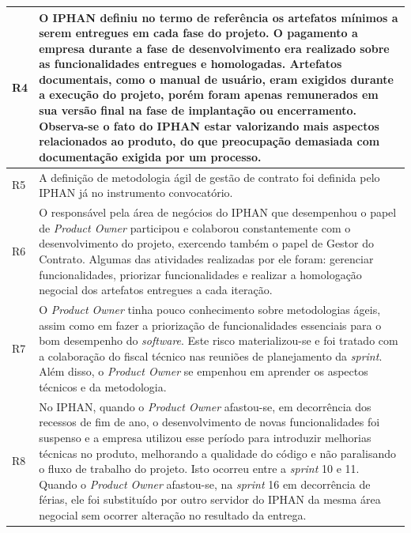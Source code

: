 \begin{longtable}{|p{2cm}|p{13cm}|}
R4                                                                &  O IPHAN definiu no termo de referência os artefatos mínimos a serem entregues em cada fase do projeto. O pagamento a empresa durante a fase de desenvolvimento era realizado sobre as funcionalidades entregues e homologadas. Artefatos documentais, como o manual de usuário, eram exigidos durante a execução do projeto, porém foram apenas remunerados em sua versão final na fase de implantação ou encerramento. Observa-se o fato do IPHAN estar valorizando mais aspectos relacionados ao produto, do que preocupação demasiada com documentação exigida por um processo.             \\ \hline
R5                                                                & A definição de metodologia ágil de gestão de contrato foi definida pelo IPHAN já no instrumento convocatório.            \\ \hline
R6                                                                & O responsável pela área de negócios do IPHAN que desempenhou o papel de \textit{Product Owner} participou e colaborou constantemente com o desenvolvimento do projeto, exercendo também o papel de Gestor do Contrato. Algumas das atividades realizadas por ele foram: gerenciar funcionalidades, priorizar funcionalidades e realizar a homologação negocial dos artefatos entregues a cada iteração. \\ \hline
R7                                                                & O \textit{Product Owner} tinha pouco conhecimento sobre metodologias ágeis, assim como em fazer a priorização de funcionalidades essenciais para o bom desempenho do \textit{software}. Este risco materializou-se e foi tratado com a colaboração do fiscal técnico nas reuniões de planejamento da \textit{sprint}. Além disso, o \textit{Product Owner} se empenhou em aprender os aspectos técnicos e da metodologia.               \\ \hline
R8                                                                & No IPHAN, quando o \textit{Product Owner} afastou-se, em decorrência dos recessos de fim de ano, o desenvolvimento de novas funcionalidades foi suspenso e a empresa utilizou esse período para introduzir melhorias técnicas no produto, melhorando a qualidade do código e não paralisando o fluxo de trabalho do projeto. Isto ocorreu entre a \textit{sprint} 10 e 11. Quando o  \textit{Product Owner} afastou-se, na \textit{sprint} 16 em decorrência de férias, ele foi substituído por outro servidor do IPHAN da mesma área negocial sem ocorrer alteração no resultado da entrega.  \\ \hline

\end{longtable}
